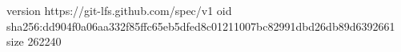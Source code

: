 version https://git-lfs.github.com/spec/v1
oid sha256:dd904f0a06aa332f85ffc65eb5dfed8c01211007bc82991dbd26db89d6392661
size 262240
